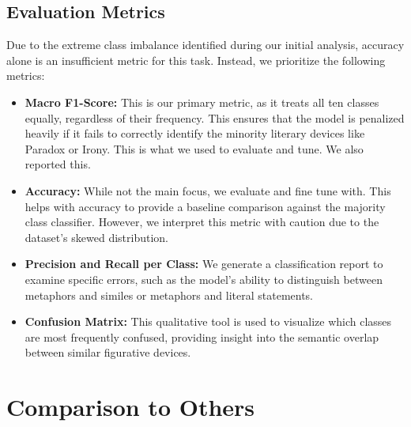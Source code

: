 \documentclass[11pt]{article}
\begin{document}
\subsection{Evaluation Metrics}
Due to the extreme class imbalance identified during our initial analysis, accuracy alone is an insufficient metric for this task. Instead, we prioritize the following metrics:
\begin{itemize}
\item \textbf{Macro F1-Score:} This is our primary metric, as it treats all ten classes equally, regardless of their frequency. This ensures that the model is penalized heavily if it fails to correctly identify the minority literary devices like Paradox or Irony. This is what we used to evaluate and tune. We also reported this.
\item \textbf{Accuracy:} While not the main focus, we evaluate and fine tune with. This helps with accuracy to provide a baseline comparison against the majority class classifier. However, we interpret this metric with caution due to the dataset's skewed distribution.
\item \textbf{Precision and Recall per Class:} We generate a classification report to examine specific errors, such as the model’s ability to distinguish between metaphors and similes or metaphors and literal statements.
\item \textbf{Confusion Matrix:} This qualitative tool is used to visualize which classes are most frequently confused, providing insight into the semantic overlap between similar figurative devices.
\end{itemize}

\section{Comparison to Others}
\end{document}
